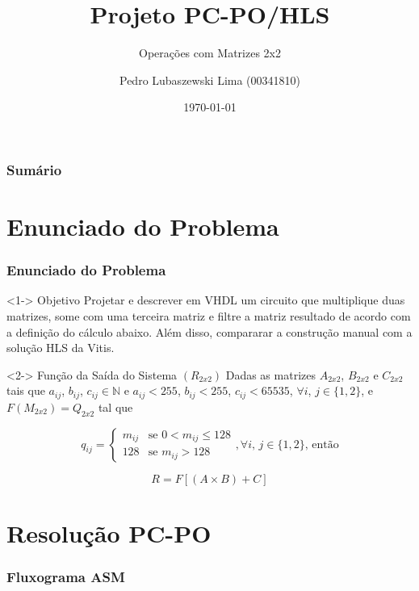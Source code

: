 \documentclass{beamer}
\title[Projeto PC-PO/HLS]{Projeto PC-PO/HLS}
\subtitle{Operações com Matrizes 2x2}
\author[Pedro Lubaszewski Lima]{Pedro Lubaszewski Lima (00341810)}
\institute[]{INF01175\\Sistemas Digitais para Computadores A}
\date[\today]{\today}
\begin{document}
    \begin{frame}
        \maketitle
    \end{frame}

    \begin{frame}
        \frametitle{Sumário}
        \tableofcontents
    \end{frame}

    \section{Enunciado do Problema}
    \begin{frame}
        \frametitle{Enunciado do Problema}

        \begin{block}<1->
            {Objetivo}
            Projetar e descrever em VHDL um
            circuito que multiplique duas matrizes,
            some com uma terceira matriz e filtre a
            matriz resultado de acordo com a definição
            do cálculo abaixo. Além disso, compararar
            a construção manual com a solução HLS da
            Vitis.
        \end{block}

        \begin{block}<2->
            {Função da Saída do Sistema $ (R_{2x2}) $}
            Dadas as matrizes $ A_{2x2} $, $ B_{2x2} $
            e $ C_{2x2} $ tais que $ a_{ij} $, $ b_{ij} $,
            $ c_{ij} \in \mathbb{N} $ e $ a_{ij} < 255 $,
            $ b_{ij} < 255 $, $ c_{ij} < 65535 $, $ \forall i $,
            $ j \in \{ 1,2 \}$, e $ F(M_{2x2}) = Q_{2x2} $ tal que

            $$ q_{ij} = 
                \begin{cases}
                    m_{ij} & \text{se } 0 < m_{ij} \leqslant 128 \\
                    128 & \text{se } m_{ij} > 128
                \end{cases}
                \text{,} \,\forall i \text{, } j \in \{ 1,2 \} \text{, então}
            $$

            $$ R = F[(A \times B) + C] $$
        \end{block}
    \end{frame}

    \section{Resolução PC-PO}
    \begin{frame}
        \frametitle{Fluxograma ASM}
    \end{frame}
\end{document}
